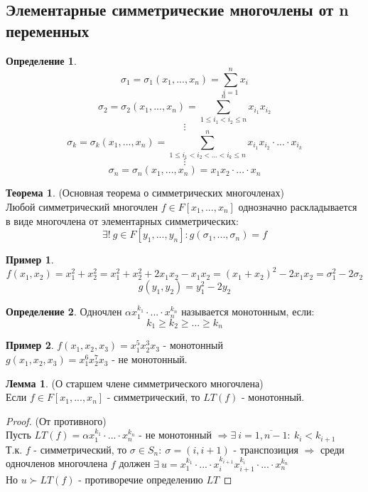 \documentclass[a4paper, 12pt]{article}
\newcommand\tab[1][.5cm]{\hspace*{#1}}
\newcounter{lemcount}
\newcounter{lemcount2}
\newcounter{thcount}
\theoremstyle{definition}
\newtheorem*{definition}{Определение}
\newtheorem*{example1}{Пример}
\newtheorem{lemmanum}[lemcount]{Лемма}
\newtheorem{theoremnum}[thcount]{Теорема}
\begin{document}
  \subsection{Элементарные симметрические многочлены от n переменных}
  \begin{definition}
    $$\sigma_1 = \sigma_1(x_1,...,x_n) = \sum \limits_{i=1}^n x_i$$
    $$\sigma_2 = \sigma_2(x_1,...,x_n) = \sum \limits_{1\leq i_1 < i_2 \leq n}^n x_{i_1}x_{i_2}$$
    $$\vdots$$ 
    $$\sigma_k = \sigma_k(x_1,...,x_n) = \sum \limits_{1\leq i_1 < i_2<...<i_k \leq n}^n x_{i_1}x_{i_2} \cdot ... \cdot x_{i_k}$$
    $$\vdots$$
    $$\sigma_n = \sigma_n(x_1,...,x_n) = x_{1}x_{2} \cdot ... \cdot x_{n}$$      
  \end{definition}
  \begin{theoremnum} (Основная теорема о симметрических многочленах)\\
    Любой симметрический многочлен $f \in F[x_1,...,x_n]$ однозначно раскладывается в виде многочлена от элементарных симметрических: 
    $$\exists ! \ g \in F[y_1,...,y_n] : g(\sigma_1,...,\sigma_n) = f$$
  \end{theoremnum}
  \begin{example1}
    $$f(x_1, x_2) = x_1^2 + x_2^2 = x_1^2 + x_2^2 + 2x_1x_2 - x_1x_2 = (x_1+x_2)^2 - 2x_1x_2 = \sigma_1^2 - 2 \sigma_2$$
    $$g(y_1,y_2) = y_1^2 - 2y_2$$  
  \end{example1}
  \begin{definition}
    Одночлен $\alpha x_1^{k_1} \cdot ... \cdot x_n^{k_n}$ называется монотонным, если: 
    $$k_1\geq k_2 \geq ... \geq k_n$$  
  \end{definition}
  \begin{example1}
    $f(x_1,x_2,x_3) = x_1^5x_2^3x_3$ - монотонный \\
    \tab[2.33cm]$g(x_1,x_2,x_3) = x_1^6x_2^7x_3$ - не монотонный.  
  \end{example1}
  \setcounter{lemcount}{0}
  \begin{lemmanum} (О старшем члене симметрического многочлена)\\
    Если $f \in F[x_1,...,x_n]$ - симметрический, то $LT(f)$ - монотонный. 
  \end{lemmanum}
  \begin{proof} (От противного)\\
    Пусть $LT(f) = \alpha x_1^{k_1} \cdot ... \cdot x_n^{k_n}$ - не монотонный $\Longrightarrow \exists \ i = \overline{1,n-1}: \ k_i<k_{i+1}$\\
    Т.к. $f$ - симметрический, то $\sigma \in S_n: \ \sigma = (i, i+1)$ - транспозиция $\Longrightarrow $ среди одночленов многочлена $f$ должен $\exists \ u = x_1^{k_1} \cdot ... \cdot x_i^{k_{i+1}}x_{i+1}^{k_i} \cdot ... \cdot x_n^{k_n}$\\
    Но $u \succ LT(f)$ - противоречие определению $LT$    
  \end{proof}
\end{document}
